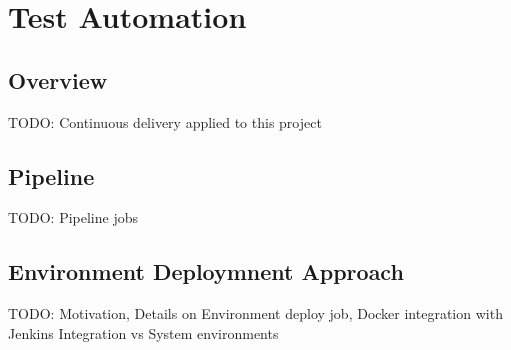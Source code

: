 
\chapter{Test Automation} %

\label{Chapter4} %




\section{Overview}
TODO: Continuous delivery applied to this project



\section{Pipeline}
TODO: Pipeline jobs



\section{Environment Deploymnent Approach}
TODO: Motivation, Details on Environment deploy job, Docker integration with Jenkins Integration vs System environments
